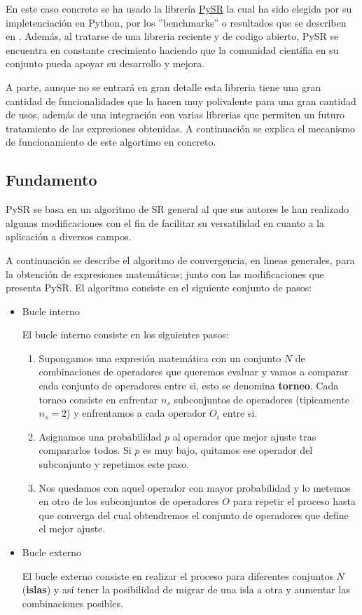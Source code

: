 \documentclass[11pt, a4paper]{article} %
\begin{document}
En este caso concreto se ha usado la librería \href{https://github.com/MilesCranmer/PySR}{PySR} la cual
ha sido elegida por su impletenciación en Python, por los ''benchmarks''  o resultados que 
se describen en \autocite{cranmerInterpretableMachineLearning2023}. Además, al tratarse de una libreria reciente y de codigo abierto,
PySR se encuentra en constante crecimiento haciendo que la comunidad científia en su conjunto pueda apoyar su desarrollo y mejora.


A parte, aunque no se entrará en gran detalle esta libreria tiene
una gran cantidad de funcionalidades que la hacen muy polivalente para una gran cantidad de usos, además de una integración con varias
librerias que permiten un futuro tratamiento de las expresiones obtenidas. A continuación se explica el mecanismo de funcionamiento
de este algortimo en concreto.
\subsection{Fundamento}

PySR se basa en un algoritmo de SR general al que sus autores le han realizado algunas modificaciones con el fin de facilitar
su versatilidad en cuanto a la aplicación a diversos campos. 

A continuación se describe el algoritmo de convergencia, en lineas generales, para la obtención de expresiones matemáticas;
junto con las modificaciones que presenta PySR. El algoritmo
consiste en el siguiente conjunto de pasos:
\begin{itemize}
    \item Bucle interno
    
    El bucle interno consiste en los siguientes pasos:
    \begin{enumerate}
        \item Supongamos una expresión matemática con un conjunto $N$ de combinaciones de operadores que queremos evaluar y vamos
        a comparar cada conjunto de operadores entre si, esto se denomina \textbf{torneo}. Cada torneo consiste en enfrentar
        $n_{s}$ subconjuntos de operadores (tipicamente $n_{s}=2$) y enfrentamos a cada operador $O_{i}$ entre si.
        \item Asignamos una probabilidad $p$ al operador que mejor ajuste tras compararlos todos. Si $p$ es muy bajo, quitamos 
        ese operador del subconjunto y repetimos este paso.
        \item Nos quedamos con aquel operador con mayor probabilidad y lo metemos en otro de los subconjuntos de operadores $O$ 
        para repetir el proceso hasta que converga del cual obtendremos el conjunto de operadores que define el mejor ajuste.
        
    \end{enumerate}
    \item Bucle externo
    
    El bucle externo consiste en realizar el proceso para diferentes conjuntos $N$ (\textbf{islas}) y así tener la posibilidad de migrar
    de una isla a otra y aumentar las combinaciones posibles. 
\end{itemize}
\end{document}
